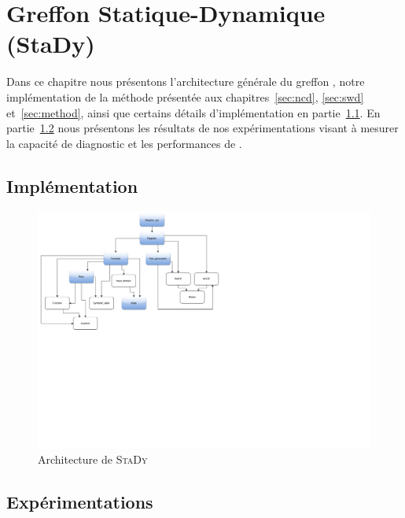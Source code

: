
\chapter{Greffon Statique-Dynamique (StaDy)}
\label{sec:stady}

\chapterintro


Dans ce chapitre nous présentons l'architecture générale du greffon \stady,
notre implémentation de la méthode présentée aux chapitres~\ref{sec:ncd},
\ref{sec:swd} et~\ref{sec:method}, ainsi que certains détails d'implémentation
en partie~\ref{sec:stady-implem}.
En partie~\ref{sec:stady-exp} nous présentons les résultats de nos
expérimentations visant à mesurer la capacité de diagnostic et les performances
de \stady.


\section{Implémentation}
\label{sec:stady-implem}


\begin{center}
  \begin{figure}
    \includegraphics[scale=.5]{figures/stady_architecture.pdf}
    \vspace{-11cm}
    \caption{Architecture de \textsc{StaDy}
      \label{fig:stady-architecture}}
  \end{figure}
\end{center}


\section{Expérimentations}
\label{sec:stady-exp}


